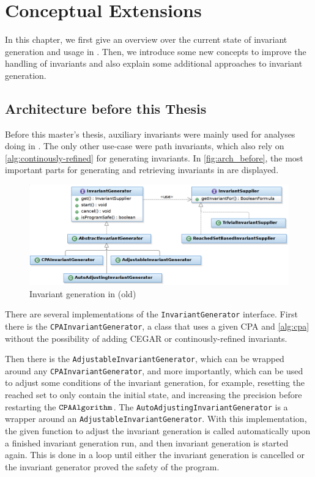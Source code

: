 \chapter{Conceptual Extensions}\label{title:concept}
In this chapter, we first give an overview over the current state of invariant generation and usage in \CPAchecker{}. Then, we introduce some new concepts to improve the handling of 
invariants and also explain some additional approaches to invariant generation.

\section{Architecture before this Thesis}\label{title:arch_old}
Before this master's thesis, auxiliary invariants were mainly used for analyses doing \Kinduction{} in \CPAchecker{}. The only other use-case were path invariants, which also rely on 
\autoref{alg:continously-refined} for generating invariants. In \autoref{fig:arch_before},  the most important parts for generating and retrieving invariants in \CPAchecker{} are displayed.

\begin{figure}
 \includegraphics[width=\textwidth]{../graphics/invgen_arch.png}
 \caption{Invariant generation in \CPAchecker{} (old)}
 \label{fig:arch_before}
\end{figure}

There are several implementations of the \texttt{InvariantGenerator} interface. First there is the \texttt{CPAInvariantGenerator}, a class that uses a given \ac{CPA} and \autoref{alg:cpa}
without the possibility of adding \ac{CEGAR} or continously-refined invariants.

Then there is the \texttt{AdjustableInvariantGenerator}, which can be wrapped around any \texttt{CPAInvariantGenerator}, and more importantly, which can be used to adjust some conditions of
the invariant generation, for example, resetting the reached set to only contain the initial state, and increasing the precision before restarting the $\mathtt{CPAAlgorithm}{}$. The
\texttt{AutoAdjustingInvariantGenerator} is a wrapper around an \texttt{AdjustableInvariantGenerator}. With this implementation, the given function to adjust the invariant generation is
called automatically upon a finished invariant generation run, and then invariant generation is started again. This is done in a loop until either the invariant generation is cancelled or
the invariant generator proved the safety of the program.

